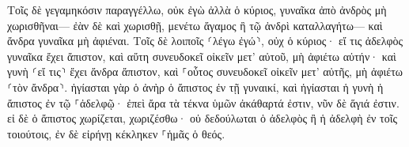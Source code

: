 \documentclass{openreader}
\begin{document}
Τοῖς δὲ γεγαμηκόσιν παραγγέλλω, οὐκ ἐγὼ ἀλλὰ ὁ κύριος, γυναῖκα ἀπὸ ἀνδρὸς μὴ χωρισθῆναι— 
ἐὰν δὲ καὶ χωρισθῇ, μενέτω ἄγαμος ἢ τῷ ἀνδρὶ καταλλαγήτω— καὶ ἄνδρα γυναῖκα μὴ ἀφιέναι. 
Τοῖς δὲ λοιποῖς ⸂λέγω ἐγώ⸃, οὐχ ὁ κύριος· εἴ τις ἀδελφὸς γυναῖκα ἔχει ἄπιστον, καὶ αὕτη συνευδοκεῖ οἰκεῖν μετ’ αὐτοῦ, μὴ ἀφιέτω αὐτήν· 
καὶ γυνὴ ⸂εἴ τις⸃ ἔχει ἄνδρα ἄπιστον, καὶ ⸀οὗτος συνευδοκεῖ οἰκεῖν μετ’ αὐτῆς, μὴ ἀφιέτω ⸂τὸν ἄνδρα⸃. 
ἡγίασται γὰρ ὁ ἀνὴρ ὁ ἄπιστος ἐν τῇ γυναικί, καὶ ἡγίασται ἡ γυνὴ ἡ ἄπιστος ἐν τῷ ⸀ἀδελφῷ· ἐπεὶ ἄρα τὰ τέκνα ὑμῶν ἀκάθαρτά ἐστιν, νῦν δὲ ἅγιά ἐστιν. 
εἰ δὲ ὁ ἄπιστος χωρίζεται, χωριζέσθω· οὐ δεδούλωται ὁ ἀδελφὸς ἢ ἡ ἀδελφὴ ἐν τοῖς τοιούτοις, ἐν δὲ εἰρήνῃ κέκληκεν ⸀ἡμᾶς ὁ θεός. 
\end{document}
